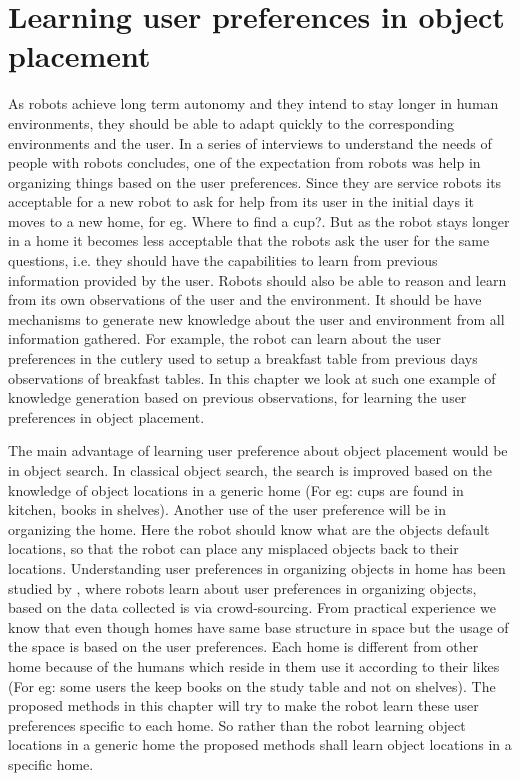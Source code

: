 \chapter{Learning user preferences in object placement}
\label{chapter: object}

As robots achieve long term autonomy and they intend to stay longer in human environments, they should be able to adapt quickly to the corresponding environments and the user.  In a series of interviews to understand the needs of people with robots \cite{pantofaru_exploring_2012} concludes, one of the
expectation from robots was help in organizing things based on the user preferences. Since they are service robots its acceptable for a new robot to ask for help from its user in the initial days it moves to a new home, for eg. Where to find a cup?. But as the robot stays longer in a home it becomes less acceptable that the robots ask the user for the same questions, i.e. they should have the capabilities to learn from previous information provided by the user. Robots should also be able to reason and learn from its own observations of the user and the environment. It should be have mechanisms to generate new knowledge about the user and environment from all information gathered. For example, the robot can learn about the user preferences in the cutlery used to setup a breakfast table from previous days observations of breakfast tables. In this chapter we look at such one example of knowledge generation based on previous observations, for learning the user preferences in object placement.

The main advantage of learning user preference about object placement would be in object search. In classical object search, the search is improved based on the knowledge of object locations in a generic home (For eg: cups are found in kitchen, books in shelves)\cite{samadi_using_2012, joho_learning_2011}. Another use of the user preference will be in organizing the home. Here the robot should know what are the objects default locations, so that the robot can place any misplaced objects back to their locations. Understanding user preferences in organizing objects in home has 
been studied by  \cite{abdo_collaborative_2014}, where robots learn about user
preferences in organizing objects, based on the data collected is via crowd-sourcing.  From practical experience we know that even though homes have same base structure in space but the usage of the space is based on the user preferences. Each home is different from other home because of the humans which reside in them use it according to their likes (For eg: some users the keep books on the study table and not on shelves). The proposed methods in this chapter will try to make the robot learn these user preferences specific to each home. So rather than the robot learning object locations in a generic home the proposed methods shall learn object locations in a specific home.


